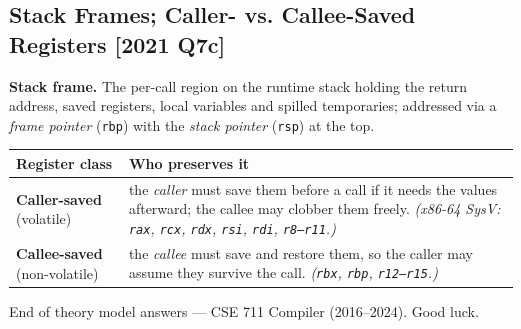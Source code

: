 \documentclass[12pt, a4paper]{article}
\newenvironment{qbox}{\begin{mdframed}[style=qframe]}{\end{mdframed}}
\newcommand{\yr}[1]{{\small\color{accent}\textbf{[#1]}}}
\newcommand{\term}[1]{\textbf{\color{keyblue}#1}}
\begin{document}
\subsection{Stack Frames; Caller- vs. Callee-Saved Registers \yr{2021 Q7c}}
\begin{qbox}
\textbf{Stack frame.} The per-call region on the runtime stack holding the return address, saved registers, local
variables and spilled temporaries; addressed via a \emph{frame pointer} (\texttt{rbp}) with the \emph{stack pointer}
(\texttt{rsp}) at the top.

\smallskip
\begin{tabularx}{\linewidth}{@{}l Y@{}}
\toprule
\textbf{Register class} & \textbf{Who preserves it}\\
\midrule
\term{Caller-saved} (volatile) & the \emph{caller} must save them before a call if it needs the values afterward; the callee may clobber them freely. \emph{(x86-64 SysV: \texttt{rax}, \texttt{rcx}, \texttt{rdx}, \texttt{rsi}, \texttt{rdi}, \texttt{r8–r11}.)}\\
\term{Callee-saved} (non-volatile) & the \emph{callee} must save and restore them, so the caller may assume they survive the call. \emph{(\texttt{rbx}, \texttt{rbp}, \texttt{r12–r15}.)}\\
\bottomrule
\end{tabularx}
\end{qbox}

\vfill
\begin{center}\small\color{sectionblue!70!black}
End of theory model answers — CSE 711 Compiler (2016–2024). Good luck.
\end{center}
\end{document}
